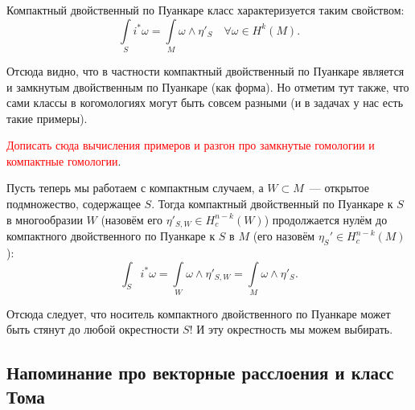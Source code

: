 	Компактный двойственный по Пуанкаре класс характеризуется таким свойством: 
	\[
		\int\limits_{S} i^* \omega = \int\limits_{M} \omega \wedge \eta'_S \quad \forall \omega \in H^k(M).
 	\]

 	Отсюда видно, что в частности компактный двойственный по Пуанкаре является и замкнутым двойственным по Пуанкаре (как форма). Но отметим тут также, что сами классы в когомологиях могут быть совсем разными (и в задачах у нас есть такие примеры). 


 	\begin{example}
 	 	\textcolor{red}{Дописать сюда вычисления примеров и разгон про замкнутые гомологии и компактные гомологии}.
 	 \end{example} 

 	 Пусть теперь мы работаем с компактным случаем, а  $W \subset M$~--- открытое подмножество, содержащее $S$. Тогда компактный двойственный по Пуанкаре к $S$ в многообразии $W$ (назовём его $\eta'_{S, W} \in H_c^{n - k}(W)$) продолжается нулём до компактного двойственного по Пуанкаре к $S$ в $M$ (его назовём $\eta_{S}' \in H_c^{n - k}(M)$):
 	 \[
 	 	\int_{S} i^* \omega = \int\limits_{W} \omega \wedge \eta'_{S, W} = \int\limits_{M} \omega \wedge \eta'_{S}.
 	 \]

 	 Отсюда следует, что носитель компактного двойственного по Пуанкаре может быть стянут до любой окрестности $S$! И эту окрестность мы можем выбирать.  



 	 \subsection{Напоминание про векторные расслоения и класс Тома}



